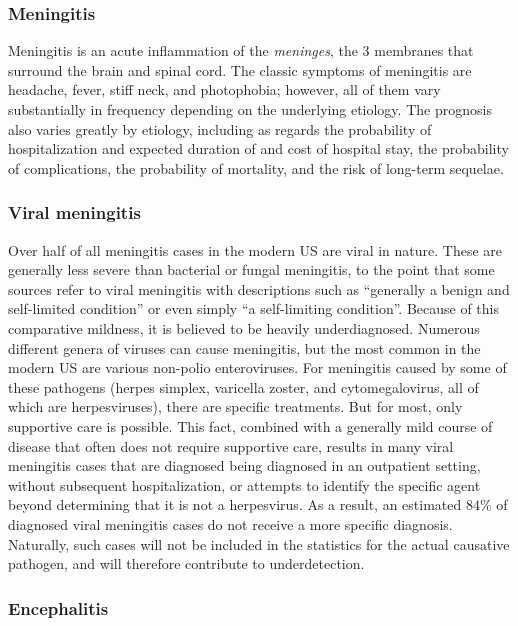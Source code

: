 \documentclass[12pt]{article}
\begin{document}
            \subsubsection{Meningitis}
                \label{meningitis}
            Meningitis is an acute inflammation of the \textit{meninges}, the 3 membranes that surround the brain and spinal cord. The classic symptoms of meningitis are headache, fever, stiff neck, and photophobia; however, all of them vary substantially in frequency depending on the underlying etiology. The prognosis also varies greatly by etiology, including as regards the probability of hospitalization and expected duration of and cost of hospital stay, the probability of complications, the probability of mortality, and the risk of long-term sequelae.

        \subsubsection{Viral meningitis}
            \label{viral-meningitis}
            Over half of all meningitis cases in the modern US are viral in nature. These are generally less severe than bacterial or fungal meningitis, to the point that some sources refer to viral meningitis with descriptions such as ``generally a benign and self-limited condition''\cite{khetsuriani2003viral} or even simply ``a self-limiting condition''\cite{balada2019cost}. Because of this comparative mildness, it is believed to be heavily underdiagnosed. Numerous different genera of viruses can cause meningitis, but the most common in the modern US are various non-polio enteroviruses. For meningitis caused by some of these pathogens (herpes simplex, varicella zoster, and cytomegalovirus, all of which are herpesviruses), there are specific treatments. But for most, only supportive care is possible. This fact, combined with a generally mild course of disease that often does not require supportive care, results in many viral meningitis cases that are diagnosed being diagnosed in an outpatient setting, without subsequent hospitalization, or attempts to identify the specific agent beyond determining that it is not a herpesvirus. As a result, an estimated $84\%$ of diagnosed viral meningitis cases do not receive a more specific diagnosis\cite{holmquist2008meningitis}. Naturally, such cases will not be included in the statistics for the actual causative pathogen, and will therefore contribute to underdetection.

        \subsubsection{Encephalitis}
            \label{encephalitis}
\end{document}
